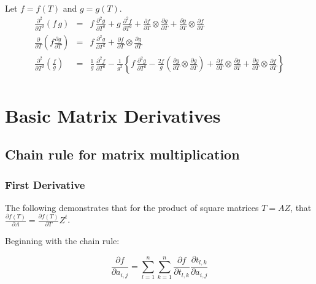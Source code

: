 \documentclass{report}
\begin{document}
\noindent Let $f=f(T)$ and $g=g(T)$.
\begin{eqnarray}
\frac{\partial^2}{\partial T^2} \left( f \, g \right) & = & f \, \frac{\partial^2 g}{\partial T^2} + g \, \frac{\partial^2 f}{\partial T^2} + \frac{\partial f}{\partial T} \otimes \frac{\partial g}{\partial T} +  \frac{\partial g}{\partial T} \otimes \frac{\partial f}{\partial T} \label{prod2} \\
\frac{\partial}{\partial T} \left( f \frac{\partial g}{\partial T} \right) & = & f \, \frac{\partial^2 g}{\partial T^2} + \frac{\partial f}{\partial T} \otimes \frac{\partial g}{\partial T} \label{diffusionopp} \\
\frac{\partial^2}{\partial T^2} \left( \frac{f}{g} \right) & = & \frac{1}{g} \, \frac{\partial^2 f}{\partial T^2} - \frac{1}{g^2} \left\{ f \, \frac{\partial^2 g}{\partial T^2} - \frac{2f}{g} \left( \frac{\partial g}{\partial T} \otimes \frac{\partial g}{\partial T} \right) + \frac{\partial f}{\partial T} \otimes \frac{\partial g}{\partial T} +  \frac{\partial g}{\partial T} \otimes \frac{\partial f}{\partial T} \right\} \nonumber \label{quotient2} \\
\end{eqnarray}

\chapter{Basic Matrix Derivatives}


\section{Chain rule for matrix multiplication}

\subsection{\label{first}First Derivative}

The following demonstrates that for the product of square matrices $T = A Z$,
that $\frac{\partial f(T)}{\partial A} = \frac{\partial f(T)}{\partial T} Z^t$. \newline

\noindent Beginning with the chain rule:

\begin{equation} 
\label{eqn0}
\frac{\partial f}{\partial a_{i,j}} = 
\sum_{l=1}^{n} \sum_{k=1}^{n} 
\frac{\partial f}{\partial t_{l,k}} 
\frac{\partial t_{l,k}}{\partial a_{i,j}}
\end{equation}
\end{document}
